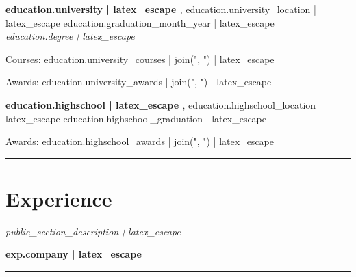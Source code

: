 \documentclass[11pt]{article}
\begin{document}
\noindent\textbf{ {{ education.university | latex_escape }} }, {{ education.university_location | latex_escape }}
\hfill {{ education.graduation_month_year | latex_escape }}\\
\textit{ {{ education.degree | latex_escape }} }\\
{%
Courses: {{ education.university_courses | join(", ") | latex_escape }}\\
{%
{%
Awards: {{ education.university_awards | join(", ") | latex_escape }}\\
{%

\vspace{2pt}

\noindent\textbf{ {{ education.highschool | latex_escape }} }, {{ education.highschool_location | latex_escape }}
\hfill {{ education.highschool_graduation | latex_escape }}\\
{%
Awards: {{ education.highschool_awards | join(", ") | latex_escape }}\\
{%

\vspace{6pt}
\noindent\rule{\linewidth}{0.4pt}
\vspace{-8pt}

\section*{Experience}

{%
\textit{ {{ public_section_description | latex_escape }} }\\
{%

{%
\noindent\textbf{ {{ exp.company | latex_escape }} }{%

{%
{%

{%

\vspace{6pt}
\noindent\rule{\linewidth}{0.4pt}
\vspace{-8pt}

}}}}}}}}}}}}}
\end{document}

